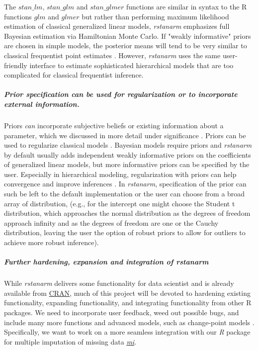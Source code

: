 \documentclass[11pt,notitlepage]{article}
\begin{document}
The $stan\_lm$, $stan\_glm$ and $stan\_glmer$ functions are similar in syntax to the R functions $glm$ 
and $glmer$ but rather than performing maximum likelihood estimation of classical generalized linear models, 
\textit{rstanarm} emphasizes full Bayesian estimation via Hamiltonian Monte Carlo. If "weakly informative" 
priors are chosen in simple models, the posterior means will tend to be very similar to classical frequentist point 
estimates \cite{Gelman-Hill_2014}. However, \textit{rstanarm} uses the same user-friendly interface to estimate 
sophisticated hierarchical models that are too complicated for classical frequentist inference.

\subparagraph*{Prior specification can be used for regularization or to incorporate external information.} 
Priors \textit{can} incorporate subjective beliefs or existing information about a parameter,  
which we discussed in more detail under significance \cite{carlin1997bayes}. 
Priors can be used to regularize classical models \cite{gelman2008weakly}. 
Bayesian models require priors and \textit{rstanarm} by default usually
adds independent weakly informative priors on the coefficients of generalized linear models, 
but more informative priors can be specified by the user. Especially in hierarchical modeling, 
regularization with priors can help convergence and improve inferences 
\cite{Gelman-Hill_2014}. In \textit{rstanarm}, specification of the prior 
can such be left to the default implementation or the user can choose from 
a broad array of distribution, (e.g., for the intercept one might choose the 
Student t distribution, which approaches the normal distribution as the 
degrees of freedom approach infinity and as the degrees of freedom are 
one or the Cauchy distribution, leaving the user the option of robust 
priors to allow for outliers to achieve more robust inference). 

\subparagraph*{Further hardening, expansion and integration of \textit{rstanarm}}
While \textit{rstanarm} delivers some functionality for data scientist and is already available from 
\href{https://cran.rstudio.com/web/packages/rstanarm/}{CRAN}, much of this project will be devoted to hardening existing functionality, 
expanding functionality, and integrating functionality from other R packages. We need to incorporate user feedback, weed out 
possible bugs, and include many more functions and advanced models, such as change-point models \cite{Hall2000}. Specifically, 
we want to work on a more seamless integration with our \textit{R} package for multiple imputation of missing data 
\href{https://cran.r-project.org/web/packages/mi/index.html}{\textit{mi}}.
\end{document}
